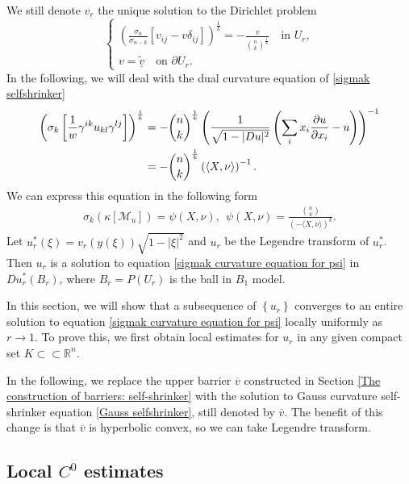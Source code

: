 \documentclass[reqno]{amsart}
\theoremstyle{remark}
\theoremstyle{definition}
\numberwithin{equation}{section}
\begin{document}
We still denote $v_r$ the unique solution to the Dirichlet problem 
\begin{equation}
    \begin{cases} 
       \left( \frac{\sigma_n}{\sigma_{n-k}} \left[v_{ij}-v\delta_{ij}\right] \right)^{\frac{1}{k}} = -\frac{v}{\binom{n}{k}^{\frac{1}{k}}} \quad \text{in } U_r, \\
       v = \tilde{\underline{v}} \quad \text{on } \partial U_r.
    \end{cases}
\end{equation}
In the following, we will deal with the dual curvature equation of \eqref{sigmak selfshrinker}
\begin{align}
    \left( \sigma_k \left[\frac{1}{w} \gamma^{ik} u_{kl} \gamma^{lj}\right] \right)^{\frac{1}{k}} &= -\binom{n}{k}^{\frac{1}{k}} \left( \frac{1}{\sqrt{1 - |Du|^2}} \left( \sum_i x_i \frac{\partial u}{\partial x_i} - u \right) \right)^{-1} \notag \\
    &= -\binom{n}{k}^{\frac{1}{k}} \left( \langle X, \nu \rangle \right)^{-1}. \label{sigmak curvature equation}
\end{align}
We can express this equation in the following form
\begin{align}
    \sigma_k(\kappa[\mathcal{M}_u]) = \psi(X, \nu) \label{sigmak curvature equation for psi},\ \  
    \psi(X, \nu) = \frac{\binom{n}{k}}{\left( -\langle X, \nu \rangle \right)^k}. 
\end{align}
Let $u_r^*(\xi) = v_r(y(\xi)) \sqrt{1 - |\xi |^2}$ and $u_r$ be the Legendre transform of $u_r^*$. Then $u_r$ is a solution to equation \eqref{sigmak curvature equation for psi} in $D u_r^*(B_r)$, where $B_r = P(U_r)$ is the ball in $B_1$ model.

In this section, we will show that a subsequence of $\left\{ u_r \right\}$ converges to an entire solution to equation \eqref{sigmak curvature equation for psi} locally uniformly as $r \to 1$. 
To prove this, we first obtain local estimates for $u_{r}$ in any given compact set $K \subset \subset \mathbb{R}^n$.

In the following, we replace the upper barrier $\overline{v}$ constructed in Section \ref{The construction of barriers: self-shrinker} with the solution to Gauss curvature self-shrinker equation \eqref{Gauss selfshrinker}, still denoted by $\overline{v}$. The benefit of this change is that  $\overline{v}$ is hyperbolic convex, so we can take Legendre transform.


\subsection{Local \texorpdfstring{$C^0$}{C0} estimates}\label{Legendre transform}
\end{document}
